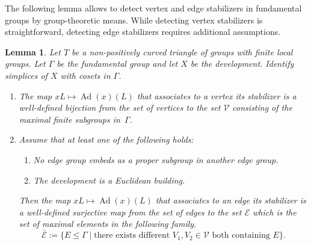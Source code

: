 \documentclass[dvipsnames]{article}
\newtheorem{lemma}[theorem]{Lemma}
\theoremstyle{definition}
\theoremstyle{remark}
\DeclareMathOperator{\Ad}{Ad}
\begin{document}
    The following lemma allows to detect vertex and edge stabilizers in fundamental groups by group-theoretic means. 
    While detecting vertex stabilizers is straightforward, detecting edge stabilizers requires additional assumptions.
    \begin{lemma}\label{lem:vertex_stab}
        Let $T$ be a non-positively curved triangle of groups with finite local groups.
        Let $\Gamma$ be the fundamental group and let $X$ be the development.
        Identify simplices of $X$ with cosets in $\Gamma$.
        \begin{enumerate}
            \item The map $xL \mapsto \Ad(x)(L)$ that associates to a vertex its stabilizer is a well-defined bijection from the set of vertices to the set $\mathcal V$ consisting of the maximal finite subgroups in~$\Gamma$.
            \item Assume that at least one of the following holds:
            \begin{enumerate}[label=(\roman*)]
                \item No edge group embeds as a proper subgroup in another edge group.
                \item The development is a Euclidean building.
            \end{enumerate}
            Then the map $xL \mapsto \Ad(x)(L)$ that associates to an edge its stabilizer is a well-defined surjective map from the set of edges to the set $\mathcal E$ which is the set of maximal elements in the following family.
            \[
                \bar{\mathcal E} := \{E \leq \Gamma \mid \text{there exists different $V_1 ,V_2 \in \mathcal V$ both containing $E$} \}.
            \]
        \end{enumerate}
    \end{lemma}
\end{document}
